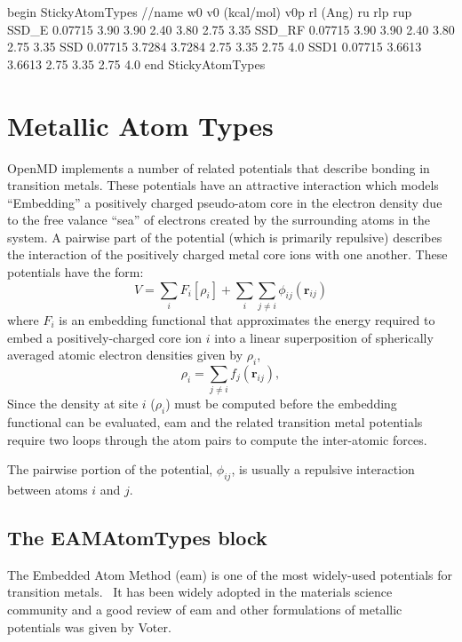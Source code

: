 \documentclass[]{book}
\begin{document}
\begin{code}[caption={[An example of a StickyAtomTypes block.] A
simple example of a StickyAtomTypes block.  Distances ($r_l$, $r_u$,
$r_{l}'$ and $r_{u}'$) are given in \AA\ and energies ($v_0, v_{0}'$)
are in units of kcal/mol. $w_0$ is unitless.},
label={sch:StickyAtomTypes}]
begin StickyAtomTypes
//name  w0      v0 (kcal/mol)   v0p     rl (Ang)  ru    rlp     rup
SSD_E   0.07715 3.90            3.90    2.40      3.80  2.75    3.35
SSD_RF  0.07715 3.90            3.90    2.40      3.80  2.75    3.35
SSD     0.07715 3.7284          3.7284  2.75      3.35  2.75    4.0
SSD1    0.07715 3.6613          3.6613  2.75      3.35  2.75    4.0
end StickyAtomTypes
\end{code}

\section{\label{section::ffMetals}Metallic Atom Types} 

{\sc OpenMD} implements a number of related potentials that describe
bonding in transition metals. These potentials have an attractive
interaction which models ``Embedding'' a positively charged
pseudo-atom core in the electron density due to the free valance
``sea'' of electrons created by the surrounding atoms in the system.
A pairwise part of the potential (which is primarily repulsive)
describes the interaction of the positively charged metal core ions
with one another.  These potentials have the form:
\begin{equation}
V  =  \sum_{i} F_{i}\left[\rho_{i}\right] + \sum_{i} \sum_{j \neq i}
\phi_{ij}(\mathbf{r}_{ij})
\end{equation}
where $F_{i} $ is an embedding functional that approximates the energy
required to embed a positively-charged core ion $i$ into a linear
superposition of spherically averaged atomic electron densities given
by $\rho_{i}$,
\begin{equation}
\rho_{i}   =  \sum_{j \neq i} f_{j}(\mathbf{r}_{ij}),
\end{equation}
Since the density at site $i$ ($\rho_i$) must be computed before the
embedding functional can be evaluated, {\sc eam} and the related
transition metal potentials require two loops through the atom pairs
to compute the inter-atomic forces.

The pairwise portion of the potential, $\phi_{ij}$, is usually a
repulsive interaction between atoms $i$ and $j$.

\subsection{\label{section:ffEAM}The EAMAtomTypes block}
The Embedded Atom Method ({\sc eam}) is one of the most widely-used
potentials for transition
metals.~\cite{Finnis84,Ercolessi88,Chen90,Qi99,Ercolessi02,Daw84,FBD86,johnson89,Lu97,Wadley:2001fk,Zhou:2001fj,Zhou:2004yq,Zhou:2005rt}
It has been widely adopted in the materials science community and a
good review of {\sc eam} and other formulations of metallic potentials
was given by Voter.\cite{Voter:95}
\end{document}
